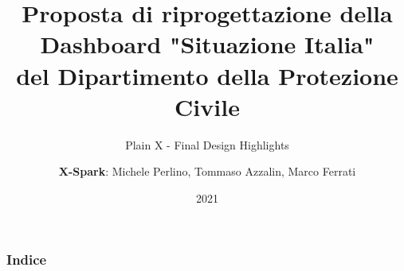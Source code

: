 





\title[Inf UFG]{Proposta di riprogettazione della\\
Dashboard "Situazione Italia"\\
del Dipartimento della Protezione Civile}
\subtitle{Plain X - Final Design Highlights}

\author{\textbf{X-Spark}: Michele Perlino, Tommaso Azzalin, Marco Ferrati}

\date{2021}
\frame[noframenumbering]{\titlepage}

\linespread{1.15}

\begin{frame}
    \frametitle{Indice}
    {
        \hypersetup{linkcolor=black}
        \tableofcontents
    }
\end{frame}








